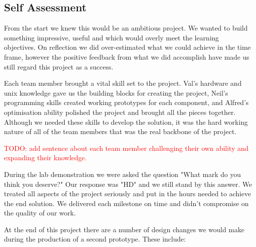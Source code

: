 \documentclass[11pt,a4paper,titlepage]{report}
\begin{document}
\subsection{Self Assessment}

From the start we knew this would be an ambitious project. We wanted to build something impressive, useful and which would overly meet the learning objectives. On reflection we did over-estimated what we could achieve in the time frame, however the positive feedback from what we did accomplish have made us still regard this project as a success.

Each team member brought a vital skill set to the project. Val's hardware and unix knowledge gave us the building blocks for creating the project, Neil's programming skills created working prototypes for each component, and Alfred's optimisation ability polished the project and brought all the pieces together. Although we needed these skills to develop the solution, it was the hard working nature of all of the team members that was the real backbone of the project.

\textcolor{red}{TODO: add sentence about each team member challenging their own ability and expanding their knowledge.}


During the lab demonstration we were asked the question "What mark do you think you deserve?" Our response was "HD" and we still stand by this answer. We treated all aspects of the project seriously and put in the hours needed to achieve the end solution. We delivered each milestone on time and didn't compromise on the quality of our work.


At the end of this project there are a number of design changes we would make during the production of a second prototype. These include:
\end{document}
